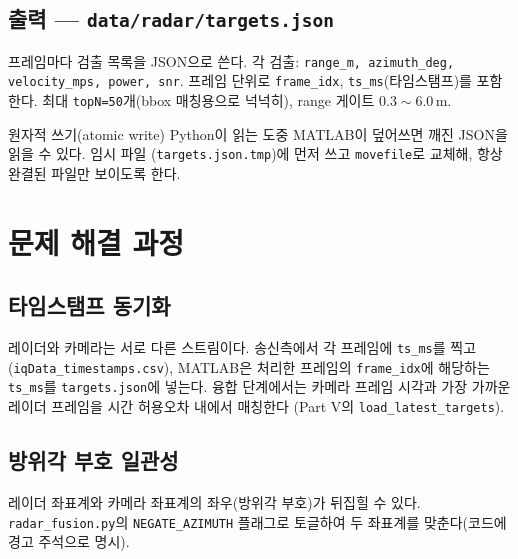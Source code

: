 \section{출력 — \texttt{data/radar/targets.json}}
프레임마다 검출 목록을 JSON으로 쓴다. 각 검출:
\texttt{range\_m, azimuth\_deg, velocity\_mps, power, snr}. 프레임 단위로
\texttt{frame\_idx}, \texttt{ts\_ms}(타임스탬프)를 포함한다. 최대
\texttt{topN=50}개(bbox 매칭용으로 넉넉히), range 게이트 $0.3\sim6.0$\,m.

\begin{designbox}{원자적 쓰기(atomic write)}
Python이 읽는 도중 MATLAB이 덮어쓰면 깨진 JSON을 읽을 수 있다. 임시 파일
(\texttt{targets.json.tmp})에 먼저 쓰고 \texttt{movefile}로 교체해, 항상 완결된
파일만 보이도록 한다.
\end{designbox}

\chapter{문제 해결 과정}

\section{타임스탬프 동기화}
레이더와 카메라는 서로 다른 스트림이다. 송신측에서 각 프레임에 \texttt{ts\_ms}를
찍고(\texttt{iqData\_timestamps.csv}), MATLAB은 처리한 프레임의 \texttt{frame\_idx}에
해당하는 \texttt{ts\_ms}를 \texttt{targets.json}에 넣는다. 융합 단계에서는 카메라
프레임 시각과 가장 가까운 레이더 프레임을 시간 허용오차 내에서 매칭한다
(Part V의 \texttt{load\_latest\_targets}).

\section{방위각 부호 일관성}
레이더 좌표계와 카메라 좌표계의 좌우(방위각 부호)가 뒤집힐 수 있다.
\texttt{radar\_fusion.py}의 \texttt{NEGATE\_AZIMUTH} 플래그로 토글하여 두 좌표계를
맞춘다(코드에 경고 주석으로 명시).
